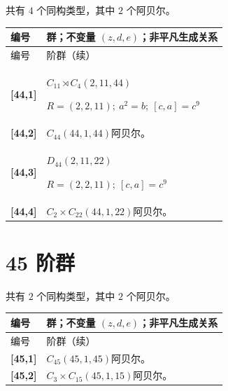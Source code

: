 \documentclass[UTF8,fontset=fandol,11pt,a4paper]{ctexart}
\begin{document}
共有 $4$ 个同构类型，其中 $2$ 个阿贝尔。

\begingroup\small\setlength{\tabcolsep}{3pt}\renewcommand{\arraystretch}{1.12}

\begin{longtable}{@{}p{17mm}>{\raggedright\arraybackslash}p{141mm}@{}}

\toprule 编号 & 群；不变量 $(z,d,e)$；非平凡生成关系\\\midrule\endfirsthead

\toprule 编号 & 44 阶群（续）\\\midrule\endhead\bottomrule\endfoot

\textbf{[44,1]} & $C_{11}\rtimes C_{4}$\quad $(2,11,44)$\par\(R=(2,2,11);\allowbreak\ a^{2}=b;\allowbreak\ [c,a]=c^{9}\)\\[3pt]

\textbf{[44,2]} & $C_{44}$\quad $(44,1,44)$\quad 阿贝尔。\\[3pt]

\textbf{[44,3]} & $D_{44}$\quad $(2,11,22)$\par\(R=(2,2,11);\allowbreak\ [c,a]=c^{9}\)\\[3pt]

\textbf{[44,4]} & $C_{2}\times C_{22}$\quad $(44,1,22)$\quad 阿贝尔。\\[3pt]

\end{longtable}\endgroup

\section*{45 阶群}\label{order:45}

共有 $2$ 个同构类型，其中 $2$ 个阿贝尔。

\begingroup\small\setlength{\tabcolsep}{3pt}\renewcommand{\arraystretch}{1.12}

\begin{longtable}{@{}p{17mm}>{\raggedright\arraybackslash}p{141mm}@{}}

\toprule 编号 & 群；不变量 $(z,d,e)$；非平凡生成关系\\\midrule\endfirsthead

\toprule 编号 & 45 阶群（续）\\\midrule\endhead\bottomrule\endfoot

\textbf{[45,1]} & $C_{45}$\quad $(45,1,45)$\quad 阿贝尔。\\[3pt]

\textbf{[45,2]} & $C_{3}\times C_{15}$\quad $(45,1,15)$\quad 阿贝尔。\\[3pt]

\end{longtable}\endgroup
\end{document}
